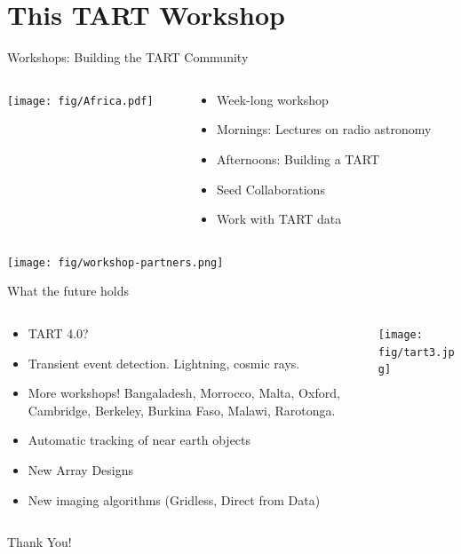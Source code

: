 \documentclass[ignorenonframetext]{beamer}
\begin{document}
\section{This TART Workshop}

\frame{\tableofcontents[currentsection]}

\begin{frame}{Workshops: Building the TART Community}
 \begin{columns}
  \begin{column}{0.4\linewidth}
\texttt{[image: fig/Africa.pdf]}
  \end{column}
  \begin{column}{0.6\linewidth}
  \begin{itemize}
   \item Week-long workshop
   \item Mornings: Lectures on radio astronomy
   \item Afternoons: Building a TART
   \item Seed Collaborations
   \item Work with TART data
  \end{itemize}
\end{column}
 \end{columns} 
 \centering
   \texttt{[image: fig/workshop-partners.png]}
\end{frame}



\begin{frame}{What the future holds}
 \begin{columns}
  \begin{column}{0.6\linewidth}
    \begin{itemize}
    \item TART 4.0?
    \item Transient event detection. Lightning, cosmic rays.
    \item More workshops! Bangaladesh, Morrocco, Malta, Oxford, Cambridge, Berkeley, Burkina Faso, Malawi, Rarotonga.
    \item Automatic tracking of near earth objects
    \item New Array Designs
    \item New imaging algorithms (Gridless, Direct from Data)
    \end{itemize}
  \end{column}
  \begin{column}{0.4\linewidth}
    \texttt{[image: fig/tart3.jpg]}
  \end{column}
\end{columns}
    \pause
    \begin{block}{}
     \begin{center} Thank You! \end{center}
    \end{block}

\end{frame}
\end{document}
